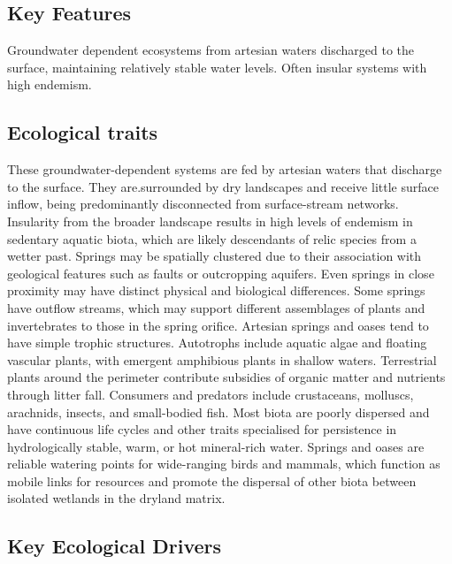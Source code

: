 \documentclass[
  letterpaper,
  DIV=11,
  numbers=noendperiod]{scrartcl}
\begin{document}
\subsection{Key Features}\label{key-features-124}

Groundwater dependent ecosystems from artesian waters discharged to the
surface, maintaining relatively stable water levels. Often insular
systems with high endemism.

\subsection{Ecological traits}\label{ecological-traits-124}

These groundwater-dependent systems are fed by artesian waters that
discharge to the surface. They are.surrounded by dry landscapes and
receive little surface inflow, being predominantly disconnected from
surface-stream networks. Insularity from the broader landscape results
in high levels of endemism in sedentary aquatic biota, which are likely
descendants of relic species from a wetter past. Springs may be
spatially clustered due to their association with geological features
such as faults or outcropping aquifers. Even springs in close proximity
may have distinct physical and biological differences. Some springs have
outflow streams, which may support different assemblages of plants and
invertebrates to those in the spring orifice. Artesian springs and oases
tend to have simple trophic structures. Autotrophs include aquatic algae
and floating vascular plants, with emergent amphibious plants in shallow
waters. Terrestrial plants around the perimeter contribute subsidies of
organic matter and nutrients through litter fall. Consumers and
predators include crustaceans, molluscs, arachnids, insects, and
small-bodied fish. Most biota are poorly dispersed and have continuous
life cycles and other traits specialised for persistence in
hydrologically stable, warm, or hot mineral-rich water. Springs and
oases are reliable watering points for wide-ranging birds and mammals,
which function as mobile links for resources and promote the dispersal
of other biota between isolated wetlands in the dryland matrix.

\subsection{Key Ecological Drivers}\label{key-ecological-drivers-124}
\end{document}

